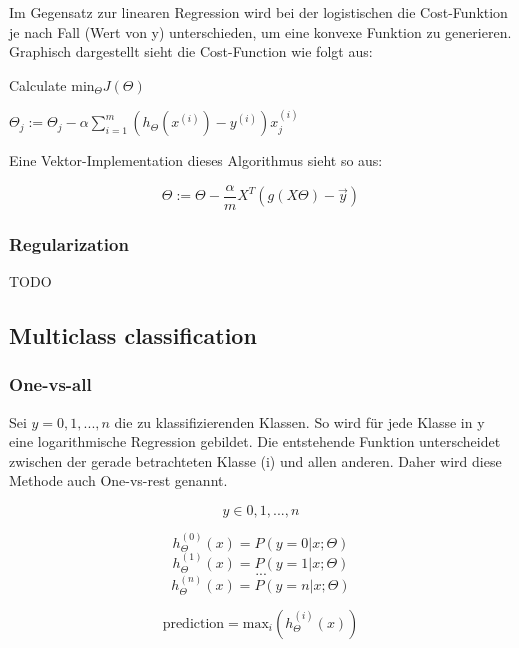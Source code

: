 \begin{flushleft}
Im Gegensatz zur linearen Regression wird bei der logistischen die Cost-Funktion je nach Fall (Wert von y) unterschieden, um eine konvexe Funktion zu generieren.
Graphisch dargestellt sieht die Cost-Function wie folgt aus:



\begin{algorithm}
\caption{Calculate $\text{min}_{\Theta} J(\Theta)$}
\begin{algorithmic} 
\Repeat 
\State $ \Theta_{j} := \Theta_{j} - \alpha\sum_{i=1}^{m}(h_{\Theta}(x^{(i)}) - y^{(i)})x_{j}^{(i)} $
\end{algorithmic}
\end{algorithm}

Eine Vektor-Implementation dieses Algorithmus sieht so aus:

$$ \Theta := \Theta - \frac{\alpha}{m} X^{T}(g(X\Theta) - \vec{y}) $$

\subsubsection{Regularization}

TODO


\subsection{Multiclass classification}
\subsubsection{One-vs-all}

Sei $y = {0, 1, ..., n}$ die zu klassifizierenden Klassen. So wird für jede Klasse in y eine logarithmische Regression gebildet. Die entstehende Funktion unterscheidet zwischen der gerade betrachteten Klasse (i) und allen anderen. Daher wird diese Methode auch One-vs-rest genannt.

$$ y \in {0, 1, ..., n} $$

$$ h_{\Theta}^{(0)}(x) = P(y=0|x;\Theta) $$
$$ h_{\Theta}^{(1)}(x) = P(y=1|x;\Theta) $$
$$ \text{...} $$
$$ h_{\Theta}^{(n)}(x) = P(y=n|x;\Theta) $$

$$ \text{prediction} = \text{max}_{i}(h_{\Theta}^{(i)}(x)) $$








\end{flushleft}



